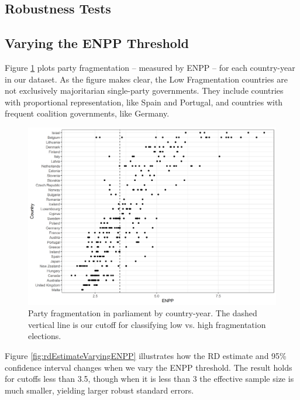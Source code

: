 \documentclass[12pt]{article}
\begin{document}



\begin{appendices}
	
	
	\section{Robustness Tests} \label{appendix:robustness}
	
	\subsection{Varying the ENPP Threshold}
    
    Figure \ref{fig:LowFragHighFrag} plots party fragmentation -- measured by ENPP -- for each country-year in our dataset. As the figure makes clear, the Low Fragmentation countries are not exclusively majoritarian single-party governments. They include countries with proportional representation, like Spain and Portugal, and countries with frequent coalition governments, like Germany.
    
    \begin{figure}[h]
		\centering
		\includegraphics[width=\linewidth]{figures/Figure7.png}
		\caption{Party fragmentation in parliament by country-year. The dashed vertical line is our cutoff for classifying low vs. high fragmentation elections.}
		\label{fig:LowFragHighFrag}
	\end{figure}
    
	Figure \ref{fig:rdEstimateVaryingENPP} illustrates how the RD estimate and 95\% confidence interval changes when we vary the ENPP threshold. The result holds for cutoffs less than 3.5, though when it is less than 3 the effective sample size is much smaller, yielding larger robust standard errors. 
	

\end{appendices}
\end{document}
